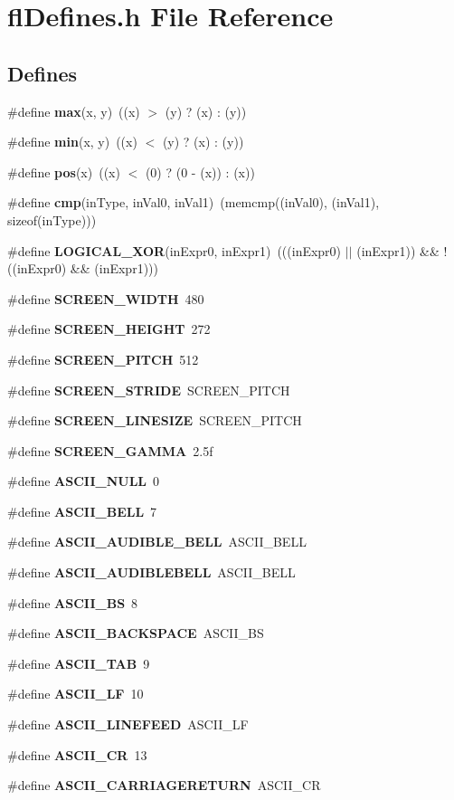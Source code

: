 \section{fl\-Defines.h File Reference}
\label{flDefines_8h}
\subsection*{Defines}
\begin{CompactItemize}
\item 
\#define {\bf max}(x, y)~((x) $>$ (y) ? (x) : (y))
\item 
\#define {\bf min}(x, y)~((x) $<$ (y) ? (x) : (y))
\item 
\#define {\bf pos}(x)~((x) $<$ (0) ? (0 - (x)) : (x))
\item 
\#define {\bf cmp}(in\-Type, in\-Val0, in\-Val1)~(memcmp((in\-Val0), (in\-Val1), sizeof(in\-Type)))
\item 
\#define {\bf LOGICAL\_\-XOR}(in\-Expr0, in\-Expr1)~(((in\-Expr0) $|$$|$ (in\-Expr1)) \&\& !((in\-Expr0) \&\& (in\-Expr1)))
\item 
\#define {\bf SCREEN\_\-WIDTH}~480
\item 
\#define {\bf SCREEN\_\-HEIGHT}~272
\item 
\#define {\bf SCREEN\_\-PITCH}~512
\item 
\#define {\bf SCREEN\_\-STRIDE}~SCREEN\_\-PITCH
\item 
\#define {\bf SCREEN\_\-LINESIZE}~SCREEN\_\-PITCH
\item 
\#define {\bf SCREEN\_\-GAMMA}~2.5f
\item 
\#define {\bf ASCII\_\-NULL}~0
\item 
\#define {\bf ASCII\_\-BELL}~7
\item 
\#define {\bf ASCII\_\-AUDIBLE\_\-BELL}~ASCII\_\-BELL
\item 
\#define {\bf ASCII\_\-AUDIBLEBELL}~ASCII\_\-BELL
\item 
\#define {\bf ASCII\_\-BS}~8
\item 
\#define {\bf ASCII\_\-BACKSPACE}~ASCII\_\-BS
\item 
\#define {\bf ASCII\_\-TAB}~9
\item 
\#define {\bf ASCII\_\-LF}~10
\item 
\#define {\bf ASCII\_\-LINEFEED}~ASCII\_\-LF
\item 
\#define {\bf ASCII\_\-CR}~13
\item 
\#define {\bf ASCII\_\-CARRIAGERETURN}~ASCII\_\-CR
\item 
$$
\end{CompactItemize}
